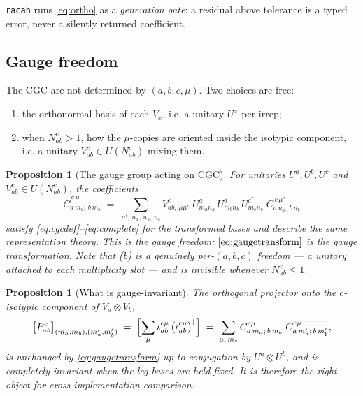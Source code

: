 \documentclass[11pt,a4paper]{article}
\theoremstyle{plain}
\newtheorem{proposition}[theorem]{Proposition}
\theoremstyle{definition}
\newcommand{\code}[1]{\texttt{#1}}
\begin{document}
\code{racah} runs \eqref{eq:ortho} as a \emph{generation gate}: a residual
above tolerance is a typed error, never a silently returned coefficient.

\subsection{Gauge freedom}
\label{sec:gauge}

The CGC are not determined by $(a,b,c,\mu)$. Two choices are free:

\begin{enumerate}[label=(\alph*),leftmargin=2.0em]
  \item the orthonormal basis of each $V_x$, i.e. a unitary $U^x$ per irrep;
  \item when $N^c_{ab}>1$, how the $\mu$-copies are oriented inside the
    isotypic component, i.e. a unitary $V^{c}_{ab}\in U(N^c_{ab})$ mixing them.
\end{enumerate}

\begin{proposition}[The gauge group acting on CGC]\label{prop:gauge}
For unitaries $U^a,U^b,U^c$ and $V^c_{ab}\in U(N^c_{ab})$, the coefficients
\begin{equation}\label{eq:gaugetransform}
  \tilde C^{\,c\,\mu}_{a\,m_a;\,b\,m_b}
  \;=\; \sum_{\mu',\,n_a,\,n_b,\,n_c}
    V^{c}_{ab,\,\mu\mu'}\;
    U^{a}_{m_a n_a}\, U^{b}_{m_b n_b}\,
    \overline{U^{c}_{m_c n_c}}\;
    C^{\,c\,\mu'}_{a\,n_a;\,b\,n_b}
\end{equation}
satisfy \eqref{eq:cgcdef}--\eqref{eq:complete} for the transformed bases and
describe the same representation theory. This is the \emph{gauge freedom};
$\eqref{eq:gaugetransform}$ is the \emph{gauge transformation}. Note that (b)
is a genuinely per-$(a,b,c)$ freedom --- a unitary attached to each
multiplicity slot --- and is invisible whenever $N^c_{ab}\le 1$.
\end{proposition}

\begin{proposition}[What is gauge-invariant]
The orthogonal projector onto the $c$-isotypic component of $V_a\otimes V_b$,
\begin{equation}\label{eq:projector}
  \bigl[P^c_{ab}\bigr]_{(m_a,m_b),(m_a',m_b')}
  \;=\; \Bigl[\sum_{\mu}
    \iota^{c\mu}_{ab}\,\bigl(\iota^{c\mu}_{ab}\bigr)^\dagger\Bigr]
  \;=\; \sum_{\mu,\,m_c}
    C^{c\mu}_{a\,m_a;\,b\,m_b}\;
    \overline{C^{c\mu}_{a\,m_a';\,b\,m_b'}} ,
\end{equation}
is unchanged by \eqref{eq:gaugetransform} up to conjugation by
$U^a\otimes U^b$, and is completely invariant when the leg bases are held
fixed. It is therefore the right object for cross-implementation comparison.
\end{proposition}
\end{document}
